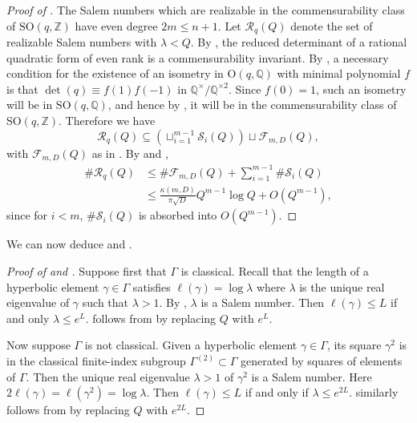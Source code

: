 \documentclass[12pt]{amsart}
\newcommand{\SO}{\mathrm{SO}}
\newcommand{\Q}{\mathbb{Q}}
\newcommand{\Z}{\mathbb{Z}}
\theoremstyle{plain}
\begin{document}
\begin{proof}[Proof of ]
    The Salem numbers which are realizable in the commensurability class of $\SO(q,\Z)$ have even degree $2m\leq n+1$. Let $\mathcal{R}_q(Q)$ denote the set of realizable Salem numbers with $\lambda<Q$. By \cite{Montesinos-Amilibia}, the reduced determinant of a rational quadratic form of even rank is a commensurability invariant. By \cite[Corollary 9.3]{Bayer-Fluckinger}, a necessary condition for the existence of an isometry in $\mathrm{O}(q,\Q)$ with minimal polynomial $f$ is that $\det(q)\equiv f(1)f(-1)$ in $\Q^\times/\Q^{\times2}$. Since $f(0)=1$, such an isometry will be in $\SO(q,\Q)$, and hence by , it will be in the commensurability class of $\SO(q,\Z)$. Therefore we have
    \[  \mathcal{R}_q(Q) \subseteq \left(\sqcup_{i=1}^{m-1} \mathcal{S}_i(Q) \right)\sqcup \mathcal{F}_{m,D}(Q), \]
    with $\mathcal{F}_{m,D}(Q)$ as in . By  and ,  
    \begin{align*}
        \# \mathcal{R}_q(Q) & \leq \# \mathcal{F}_{m,D}(Q)+ \sum_{i=1}^{m-1} \# \mathcal{S}_i(Q) 
        \\ &\leq  \frac{\kappa(m,D)}{\pi\sqrt{D}}Q^{m-1}\log Q + O(Q^{m-1}),
    \end{align*} 
    since for $i<m$, $\# \mathcal{S}_i(Q)$ is absorbed into $O(Q^{m-1})$.
\end{proof}

We can now deduce  and .

\begin{proof}[Proof of  and ]
    Suppose first that $\Gamma$ is classical. Recall that the length of a hyperbolic element $\gamma\in\Gamma$ satisfies $\ell(\gamma)=\log\lambda$ where $\lambda$ is the unique real eigenvalue of $\gamma$ such that $\lambda>1$. By , $\lambda$ is a Salem number. Then $\ell(\gamma)\leq L$ if and only $\lambda\leq e^L$. 
     follows from  by replacing $Q$ with $e^L$.

    Now suppose $\Gamma$ is not classical. Given a hyperbolic element $\gamma\in\Gamma$, its square $\gamma^2$ is in the classical finite-index subgroup $\Gamma^{(2)}\subset\Gamma$ generated by squares of elements of $\Gamma$. Then the unique real eigenvalue $\lambda>1$ of $\gamma^2$ is a Salem number. Here $2\ell(\gamma)=\ell(\gamma^2)=\log\lambda$. Then $\ell(\gamma)\leq L$ if and only if
    $\lambda\leq e^{2L}$.
     similarly follows from  by replacing $Q$ with $e^{2L}$.
\end{proof}
\end{document}
